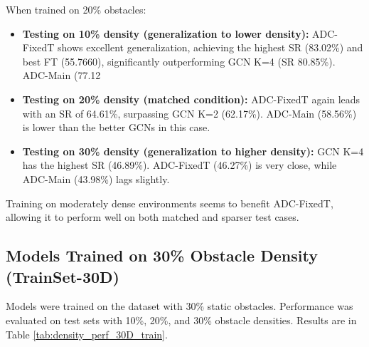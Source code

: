 When trained on 20\% obstacles:
\begin{itemize}
    \item \textbf{Testing on 10\% density (generalization to lower density):} ADC-FixedT shows excellent generalization, achieving the highest SR (83.02\%) and best FT (55.7660), significantly outperforming GCN K=4 (SR 80.85\%). ADC-Main (77.12%
    \item \textbf{Testing on 20\% density (matched condition):} ADC-FixedT again leads with an SR of 64.61\%, surpassing GCN K=2 (62.17\%). ADC-Main (58.56\%) is lower than the better GCNs in this case.
    \item \textbf{Testing on 30\% density (generalization to higher density):} GCN K=4 has the highest SR (46.89\%). ADC-FixedT (46.27\%) is very close, while ADC-Main (43.98\%) lags slightly.
\end{itemize}
Training on moderately dense environments seems to benefit ADC-FixedT, allowing it to perform well on both matched and sparser test cases.

\subsection{Models Trained on 30\% Obstacle Density (TrainSet-30D)}
\label{subsec:perf_30D_train_detailed}
Models were trained on the dataset with 30\% static obstacles. Performance was evaluated on test sets with 10\%, 20\%, and 30\% obstacle densities. Results are in Table \ref{tab:density_perf_30D_train}.


